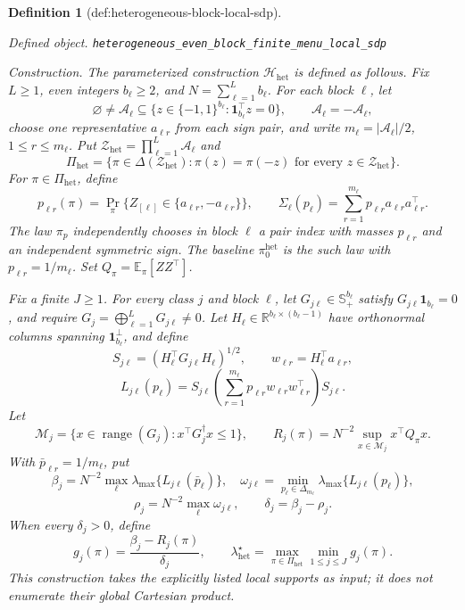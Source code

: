 \documentclass{article}
\newtheorem{definition}{Definition}
\begin{document}
\begin{definition}[def:heterogeneous-block-local-sdp]\label{def:heterogeneous-block-local-sdp}
\par\smallskip\noindent\emph{Defined object.} \texttt{heterogeneous\_\allowbreak{}even\_\allowbreak{}block\_\allowbreak{}finite\_\allowbreak{}menu\_\allowbreak{}local\_\allowbreak{}sdp}
\par\smallskip\noindent\emph{Construction.} The parameterized construction \(\mathcal H_{\mathrm{het}}\) is defined as follows.  Fix \(L\ge1\), even integers \(b_\ell\ge2\), and \(N=\sum_{\ell=1}^L b_\ell\).  For each block \(\ell\), let
\[
\varnothing\ne\mathcal A_\ell
\subseteq\{z\in\{-1,1\}^{b_\ell}:\mathbf 1_{b_\ell}^\top z=0\},
\qquad \mathcal A_\ell=-\mathcal A_\ell,
\]
choose one representative \(a_{\ell r}\) from each sign pair, and write \(m_\ell=|\mathcal A_\ell|/2\), \(1\le r\le m_\ell\).  Put \(\mathcal Z_{\mathrm{het}}=\prod_{\ell=1}^L\mathcal A_\ell\) and
\[
\Pi_{\mathrm{het}}
=\{\pi\in\Delta(\mathcal Z_{\mathrm{het}}):\pi(z)=\pi(-z)\text{ for every }z\in\mathcal Z_{\mathrm{het}}\}.
\]
For \(\pi\in\Pi_{\mathrm{het}}\), define
\[
p_{\ell r}(\pi)=\Pr_\pi\{Z_{[\ell]}\in\{a_{\ell r},-a_{\ell r}\}\},
\qquad
\Sigma_\ell(p_\ell)=\sum_{r=1}^{m_\ell}p_{\ell r}a_{\ell r}a_{\ell r}^\top.
\]
The law \(\pi_p\) independently chooses in block \(\ell\) a pair index with masses \(p_{\ell r}\) and an independent symmetric sign.  The baseline \(\pi_0^{\mathrm{het}}\) is the such law with \(p_{\ell r}=1/m_\ell\).  Set \(Q_\pi=\mathbb E_\pi[ZZ^\top]\).

Fix a finite \(J\ge1\).  For every class \(j\) and block \(\ell\), let \(G_{j\ell}\in\mathbb S_+^{b_\ell}\) satisfy \(G_{j\ell}\mathbf1_{b_\ell}=0\), and require \(G_j=\bigoplus_{\ell=1}^LG_{j\ell}\ne0\).  Let \(H_\ell\in\mathbb R^{b_\ell\times(b_\ell-1)}\) have orthonormal columns spanning \(\mathbf1_{b_\ell}^\perp\), and define
\[
S_{j\ell}=(H_\ell^\top G_{j\ell}H_\ell)^{1/2},
\qquad
w_{\ell r}=H_\ell^\top a_{\ell r},
\]
\[
L_{j\ell}(p_\ell)
=S_{j\ell}\left(\sum_{r=1}^{m_\ell}p_{\ell r}w_{\ell r}w_{\ell r}^\top\right)S_{j\ell}.
\]
Let
\[
\mathcal M_j=\{x\in\operatorname{range}(G_j):x^\top G_j^\dagger x\le1\},
\qquad
R_j(\pi)=N^{-2}\sup_{x\in\mathcal M_j}x^\top Q_\pi x.
\]
With \(\bar p_{\ell r}=1/m_\ell\), put
\[
\beta_j=N^{-2}\max_\ell\lambda_{\max}\{L_{j\ell}(\bar p_\ell)\},
\quad
\omega_{j\ell}=\min_{p_\ell\in\Delta_{m_\ell}}\lambda_{\max}\{L_{j\ell}(p_\ell)\},
\]
\[
\rho_j=N^{-2}\max_\ell\omega_{j\ell},
\qquad
\delta_j=\beta_j-\rho_j.
\]
When every \(\delta_j>0\), define
\[
g_j(\pi)=\frac{\beta_j-R_j(\pi)}{\delta_j},
\qquad
\lambda_{\mathrm{het}}^\star
=\max_{\pi\in\Pi_{\mathrm{het}}}\min_{1\le j\le J}g_j(\pi).
\]
This construction takes the explicitly listed local supports as input; it does not enumerate their global Cartesian product.
\end{definition}
\end{document}
